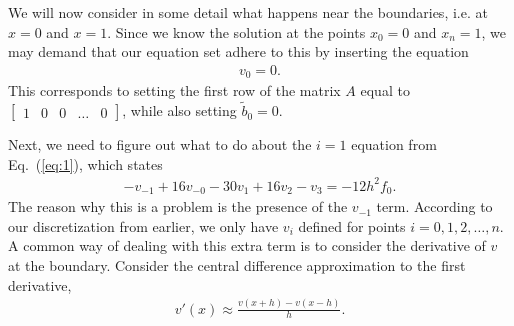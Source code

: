 \documentclass[11pt,a4wide]{article}
\newcommand{\eq} [1]{Eq.\ (\ref{eq:#1})}
\begin{document}
We will now consider in some detail what happens near the boundaries, i.e. at $x=0$ and $x=1$. Since we know the solution at the points $x_0=0$ and $x_n=1$, we may demand that our equation set adhere to this by inserting the equation 
\begin{align}
v_0 = 0.
\end{align}
This corresponds to setting the first row of the matrix $A$ equal to $\begin{bmatrix}1 & 0 & 0 & \dots & 0 \end{bmatrix}$, while also setting $\tilde{b}_0=0$. 

Next, we need to figure out what to do about the $i=1$ equation from \eq{1}, which states 
\begin{align}
-v_{-1}+16v_{-0}-30v_1+16v_{2}-v_{3} = -12h^2f_0. \label{eq:2}
\end{align}
The reason why this is a problem is the presence of the $v_{-1}$ term. According to our discretization from earlier, we only have $v_i$ defined for points $i=0,1,2,\dots,n$. A common way of dealing with this extra term is to consider the derivative of $v$ at the boundary. Consider the central difference approximation to the first derivative, 
\begin{align}
v'(x) \approx \frac{v(x+h)-v(x-h)}{h}. \label{eq:3}
\end{align}
\end{document}
